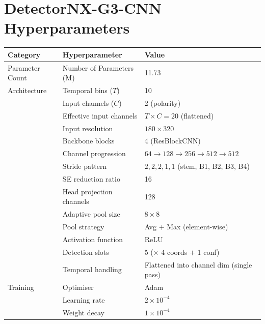 \section{DetectorNX-G3-CNN Hyperparameters}

\begin{table}[H]
\centering
\small
\begin{tabular}{|l|l|l|}
\hline
\textbf{Category} & \textbf{Hyperparameter} & \textbf{Value} \\
\hline
Parameter Count  & Number of Parameters (M)             & 11.73 \\
\hline
Architecture     & Temporal bins ($T$)                  & 10 \\
                 & Input channels ($C$)                 & 2 (polarity) \\
                 & Effective input channels             & $T \times C = 20$ (flattened) \\
                 & Input resolution                     & $180 \times 320$ \\
                 & Backbone blocks                      & 4 (ResBlockCNN) \\
                 & Channel progression                  & $64 \to 128 \to 256 \to 512 \to 512$ \\
                 & Stride pattern                       & $2, 2, 2, 1, 1$ (stem, B1, B2, B3, B4) \\
                 & SE reduction ratio                   & 16 \\
                 & Head projection channels             & 128 \\
                 & Adaptive pool size                   & $8 \times 8$ \\
                 & Pool strategy                        & Avg $+$ Max (element-wise) \\
                 & Activation function                  & ReLU \\
                 & Detection slots                      & 5 ($\times$ 4 coords $+$ 1 conf) \\
                 & Temporal handling                    & Flattened into channel dim (single pass) \\
\hline
Training         & Optimiser                            & Adam \\
                 & Learning rate                        & $2 \times 10^{-4}$ \\
                 & Weight decay                         & $1 \times 10^{-4}$ \\

\end{tabular}
\end{table}
